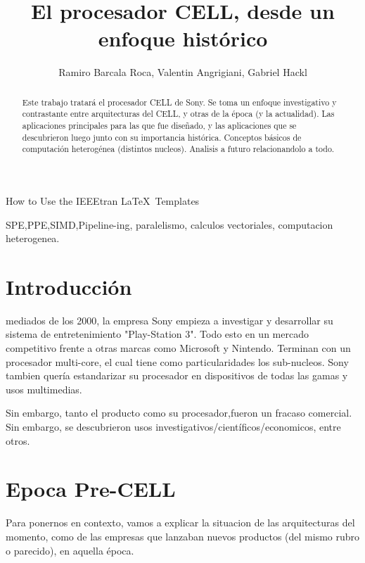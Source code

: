 \documentclass[11pt,compsoc]{IEEEtran}
\begin{document}
	\title{El procesador CELL, desde un enfoque
		histórico}
	\author{Ramiro Barcala Roca, Valentin Angrigiani, Gabriel Hackl}
		
	{How to Use the IEEEtran \LaTeX \ Templates}
	\maketitle
	
	\begin{abstract}
		Este trabajo tratará el procesador CELL de Sony. Se toma un enfoque investigativo y contrastante entre arquitecturas del CELL, y otras de la época (y la actualidad). Las aplicaciones principales para las que fue diseñado, y las aplicaciones que se descubrieron luego junto  con su importancia histórica. Conceptos básicos de computación heterogénea (distintos nucleos). Analisis a futuro relacionandolo a todo.
	\end{abstract}
	
	\begin{IEEEkeywords}
		SPE,PPE,SIMD,Pipeline-ing, paralelismo, calculos vectoriales, computacion heterogenea.
	\end{IEEEkeywords}
	
	\section{Introducción}
	 mediados de los 2000, la empresa Sony empieza a investigar y desarrollar su sistema de entretenimiento "Play-Station 3". Todo esto en un mercado competitivo frente a otras marcas como Microsoft y Nintendo. Terminan con un procesador multi-core, el cual tiene como particularidades los sub-nucleos. Sony tambien quería estandarizar su procesador en dispositivos de todas las gamas y usos multimedias.
	
	Sin embargo, tanto el producto como su procesador,fueron un fracaso comercial. Sin embargo, se descubrieron usos investigativos/científicos/economicos, entre otros.
	
	
	\section{Epoca Pre-CELL}
	\noindent Para ponernos en contexto, vamos a explicar la situacion de las arquitecturas del momento, como de las empresas que lanzaban nuevos productos (del mismo rubro o parecido), en aquella época.
	
\end{document}
